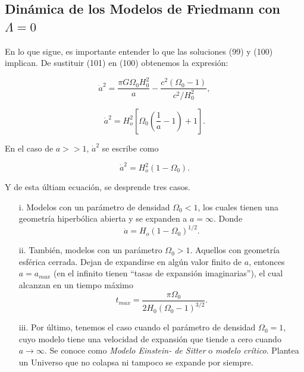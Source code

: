 \documentclass[11pt]{article}
\begin{document}
{{      \subsection{Dinámica de los Modelos de Friedmann con $\Lambda = 0$}  
    
    En lo que sigue, es importante entender lo que las soluciones (99) y (100) implican. De sustituir (101) en (100) obtenemos la expresión: 
    
    \begin{equation*}
       \dot{a}^2 = \frac{\pi G \Omega_0 H_0^2  }{a} - \frac{c^2 (\Omega_0 - 1)}{c^2/H_0^2}, 
    \end{equation*}
    
    \begin{equation}
       \boxed{\dot{a}^2 = H_o^2 \left[ \Omega_0 \left( \frac{1}{a} - 1 \right) + 1 \right].}
    \end{equation}
    
    En el caso de $a >> 1$, $\dot{a}^2$ se escribe como
    
    \begin{equation}
        \boxed{ \dot{a}^2  = H_o^2 (1- \Omega_0).}
    \end{equation}
    
    Y de esta últiam ecuación, se desprende tres casos. 
    
    \begin{itemize}
        \item[i.] Modelos con un parámetro de densidad $\Omega_0 < 1$, los cuales tienen una geometría hiperbólica abierta y se expanden a $a=\infty$. Donde 
        $$\dot{a}  = H_o (1- \Omega_0)^{1/2}.$$
        
        \item[ii.] También, modelos con un parámetro $\Omega_0 >1$. Aquellos con geometría esférica cerrada. Dejan de expandirse en algún valor finito de $a$, entonces $a=a_{max}$ (en el infinito tienen ``tasas de expansión imaginarias''), el cual alcanzan en un tiempo máximo 
        $$t_{max} = \frac{\pi \Omega_0}{2 H_0 (\Omega_0 - 1)^{3/2}}.$$
        
        \item[iii.] Por último, tenemos el caso cuando el parámetro de densidad $\Omega_0 = 1$, cuyo modelo tiene una velocidad de expansión que tiende a cero cuando $a \rightarrow{\infty}$. 
    Se conoce como {\textit{Modelo Einstein- de Sitter}} o {\textit{modelo crítico}}. Plantea un Universo que no colapsa ni tampoco se expande por siempre. 


\end{itemize}}}
\end{document}
